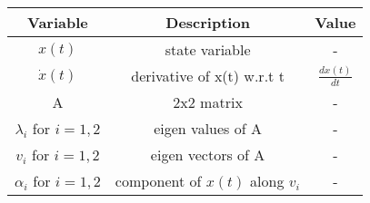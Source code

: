 \begin{tabular}{|c|c|c|} 
      \hline
\textbf{Variable}& \textbf{Description}& \textbf{Value}\\\hline
	 ${x}(t)$ & state variable & - \\\hline
         $\dot{{x}}(t)$ & derivative of x(t) w.r.t t & $\frac{d{x}(t)}{dt}$\\\hline  
         A & 2x2 matrix & -\\\hline
         $\lambda _i$ for $i = 1, 2$ & eigen values of A & - \\\hline
         $v_i$ for $i = 1, 2$ & eigen vectors of A & - \\\hline
         $\alpha _i$ for $i = 1, 2$ & component of $x(t)$ along $v_i$ & - \\\hline
    \end{tabular}
